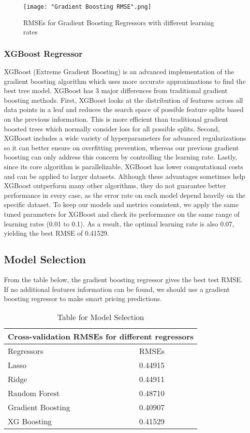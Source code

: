 \documentclass[twocolumn]{article}
\begin{document}
\begin{figure}[h]
    \centering
    \texttt{[image: "Gradient Boosting RMSE".png]}
    \caption{RMSEs for Gradient Boosting Regressors with different learning rates}
\end{figure}

\subsubsection{XGBoost Regressor}
XGBoost (Extreme Gradient Boosting) is an advanced implementation of the gradient boosting algorithm which uses more accurate approximations to find the best tree model. XGBoost has 3 major differences from traditional gradient boosting methods. First, XGBoost looks at the distribution of features across all data points in a leaf and reduces the search space of possible feature splits based on the previous information. This is more efficient than traditional gradient boosted trees which normally consider loss for all possible splits. Second, XGBoost includes a wide variety of hyperparameters for advanced regularizations so it can better ensure on overfitting prevention, whereas our previous gradient boosting can only address this concern by controlling the learning rate. Lastly, since its core algorithm is parallelizable, XGBoost has lower computational costs and can be applied to larger datasets. Although these advantages sometimes help XGBoost outperform many other algorithms, they do not guarantee better performance in every case, as the error rate on each model depend heavily on the specific dataset. To keep our models and metrics consistent, we apply the same tuned parameters for XGBoost and check its performance on the same range of learning rates (0.01 to 0.1). As a result, the optimal learning rate is also 0.07, yielding the best RMSE of 0.41529.


\subsection{Model Selection}
From the table below, the gradient boosting regressor gives the best test RMSE. If no additional features information can be found, we should use a gradient boosting regressor to make smart pricing predictions. 
\begin{table}[h!]
\centering
\begin{tabular}{ |p{3cm}||p{1cm}|  }
 \hline
 \multicolumn{2}{|c|}{Cross-validation RMSEs for different regressors} \\
 \hline
 Regressors& RMSEs\\
 \hline
 Lasso   & 0.44915 \\
 Ridge &  0.44911 \\
 Random Forest & 0.48710 \\
 Gradient Boosting & 0.40907\\
 XG Boosting& 0.41529\\
 \hline
\end{tabular}
\caption{Table for Model Selection}
\label{table:1}
\end{table}
\end{document}
